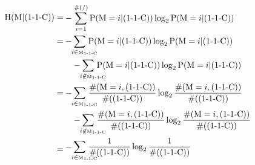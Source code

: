 \documentclass{article}
\begin{document}
\begin{align*}
    \mbox{H}(\mbox{M}|(\mbox{1-1-C})) =& \begin{multlined}
        -\sum_{i=1}^{\#(/)} \mbox{P}(\mbox{M}=i|(\mbox{1-1-C}))\log_2\mbox{P}(\mbox{M}=i|(\mbox{1-1-C}))
    \end{multlined}\\
    =& \begin{multlined}[t]
        -\hspace{-0.5cm}\sum_{\hspace{0.4cm}i\tiny\in\mbox{M}_{\mbox{1-1-C}}}\hspace{-0.45cm}\mbox{P}(\mbox{M}=i|(\mbox{1-1-C}))\log_2\mbox{P}(\mbox{M}=i|(\mbox{1-1-C})) \\- \hspace{-0.5cm}\sum_{\hspace{0.4cm}i\tiny\not\in\mbox{M}_{\mbox{1-1-C}}}\hspace{-0.45cm}\mbox{P}(\mbox{M}=i|(\mbox{1-1-C}))\log_2\mbox{P}(\mbox{M}=i|(\mbox{1-1-C}))
    \end{multlined}\\
    =& \begin{multlined}[t]
        -\hspace{-0.5cm}\sum_{\hspace{0.4cm}i\tiny\in\mbox{M}_{\mbox{1-1-C}}}\hspace{-0.45cm}\frac{\#(\mbox{M}=i, (\mbox{1-1-C}))}{\#((\mbox{1-1-C}))}\log_2\frac{\#(\mbox{M}=i, (\mbox{1-1-C}))}{\#((\mbox{1-1-C}))} \\- \hspace{-0.5cm}\sum_{\hspace{0.4cm}i\tiny\not\in\mbox{M}_{\mbox{1-1-C}}}\hspace{-0.45cm}\frac{\#(\mbox{M}=i, (\mbox{1-1-C}))}{\#((\mbox{1-1-C}))}\log_2\frac{\#(\mbox{M}=i, (\mbox{1-1-C}))}{\#((\mbox{1-1-C}))}
    \end{multlined}\\
    =& \begin{multlined}
        -\hspace{-0.5cm}\sum_{\hspace{0.4cm}i\tiny\in\mbox{M}_{\mbox{1-1-C}}}\hspace{-0.45cm}\frac{1}{\#((\mbox{1-1-C}))}\log_2\frac{1}{\#((\mbox{1-1-C}))}
    \end{multlined}
\end{align*}
\end{document}
